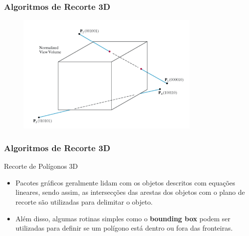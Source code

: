 \documentclass{beamer}
\begin{document}
\begin{frame}
\frametitle{Algoritmos de Recorte 3D}
	\begin{figure}[!h]
			\begin{center}
			\includegraphics[width=0.8\textwidth]{Figures/RecLin}
			\end{center}
	\end{figure}
\end{frame}

\begin{frame}
\frametitle{Algoritmos de Recorte 3D}
	\begin{block}{Recorte de Polígonos 3D}
		\begin{itemize}
			\item Pacotes gráficos geralmente lidam com os objetos descritos com equações lineares, sendo assim, as intersecções das arestas dos objetos com o plano de recorte são utilizadas para delimitar o objeto.
			\item Além disso, algumas rotinas simples como o \textbf{bounding box} podem ser utilizadas para definir se um polígono está dentro ou fora das fronteiras.			 
		\end{itemize}	
	\end{block}
\end{frame}

\end{document}
